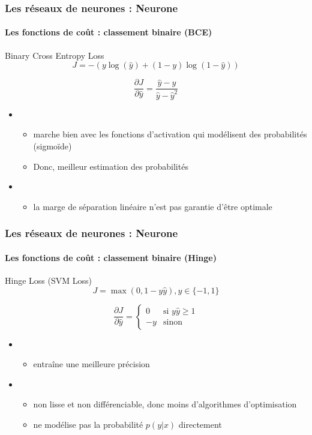 \documentclass[xcolor=table]{beamer}
\begin{document}
\begin{frame}
\frametitle{Les réseaux de neurones : Neurone}
\framesubtitle{Les fonctions de coût : classement binaire (BCE)}

\begin{block}{Binary Cross Entropy Loss}
	\[J = - (y \log(\hat{y}) + (1 - y) \log(1 - \hat{y}))\]
	
	\[
	\frac{\partial J}{\partial \hat{y}} = \frac{\hat{y} - y}{\hat{y} - \hat{y}^2}
	\]
\end{block}

\begin{itemize}
	\item {}
	\begin{itemize}
		\item marche bien avec les fonctions d'activation qui modélisent des probabilités (sigmoïde)
		\item Donc, meilleur estimation des probabilités
	\end{itemize}
	\item {}
	\begin{itemize}
		\item la marge de séparation linéaire n'est pas garantie d'être optimale
	\end{itemize}
\end{itemize}

\end{frame}

\begin{frame}
\frametitle{Les réseaux de neurones : Neurone}
\framesubtitle{Les fonctions de coût : classement binaire (Hinge)}

\begin{block}{Hinge Loss (SVM Loss)}
	\[J = \max(0, 1 - y \hat{y}), y \in \{-1, 1\}\]
	
	\[
	\frac{\partial J}{\partial \hat{y}} = 
	\begin{cases}
	0 & \text{si } y \hat{y} \ge 1 \\
	-y & \text{sinon}
	\end{cases}
	\]
\end{block}

\begin{itemize}
	\item {}
	\begin{itemize}
		\item entraîne une meilleure précision
	\end{itemize}
	\item {}
	\begin{itemize}
		\item non lisse et non différenciable, donc moins d'algorithmes d'optimisation
		\item ne modélise pas la probabilité $p(y|x)$ directement
	\end{itemize}
\end{itemize}

\end{frame}
\end{document}
